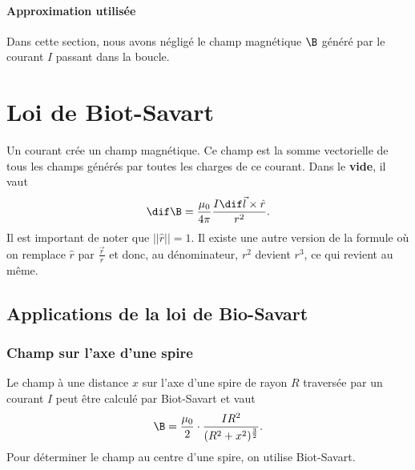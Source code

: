 \paragraph{Approximation utilisée}
Dans cette section, nous avons négligé le champ magnétique $\B$
généré par le courant $I$ passant dans la boucle.

\section{Loi de Biot-Savart}
\label{sec:bs}
Un courant crée un champ magnétique.
Ce champ est la somme vectorielle de tous les champs
générés par toutes les charges de ce courant.
Dans le \textbf{vide}, il vaut
\[ \dif\B = \frac{\mu_0}{4\pi}\frac{I\dif \vec l\times \hat r}{r^2}. \]
Il est important de noter que $||\hat r|| = 1$.
Il existe une autre version de la formule où on remplace $\hat r$ par
$\frac{\vec r}{r}$ et donc, au dénominateur,
$r^2$ devient $r^3$, ce qui revient au même.

\subsection{Applications de la loi de Bio-Savart}
\subsubsection{Champ sur l'axe d'une spire}
Le champ à une distance $x$ sur l'axe d'une spire de rayon
$R$ traversée par un courant $I$ peut être calculé par Biot-Savart et vaut
\[ \B = \frac{\mu_0}{2}\cdot\frac{IR^2}{(R^2 + x^2)^{\frac{3}{2}}}. \]
Pour déterminer le champ au centre d'une spire, on utilise Biot-Savart.

